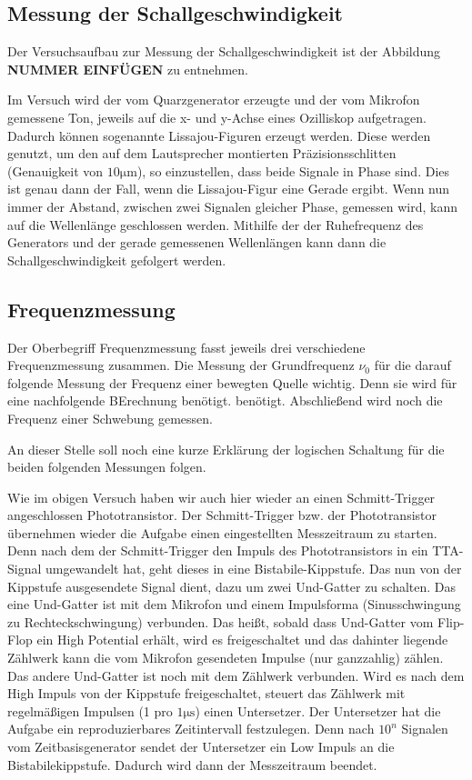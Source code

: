 \documentclass[parskip=half]{scrartcl} %
\begin{document}
\subsection{Messung der Schallgeschwindigkeit}

Der Versuchsaufbau zur Messung der Schallgeschwindigkeit ist der
Abbildung \textbf{ NUMMER EINFÜGEN} zu entnehmen.

Im Versuch wird der vom Quarzgenerator erzeugte und der vom Mikrofon gemessene 
Ton, jeweils auf die x- und y-Achse eines Ozilliskop aufgetragen.
Dadurch können sogenannte Lissajou-Figuren erzeugt werden.
Diese werden genutzt, um den auf dem Lautsprecher montierten Präzisionsschlitten 
(Genauigkeit von $10\si{\micro\meter}$), so 
einzustellen, dass beide Signale in Phase sind. 
Dies ist genau dann der Fall, wenn die Lissajou-Figur eine Gerade ergibt.
Wenn nun immer der Abstand, zwischen zwei 
Signalen gleicher Phase, gemessen wird, kann auf die Wellenlänge geschlossen werden.
Mithilfe der der Ruhefrequenz des Generators und der gerade gemessenen 
Wellenlängen kann dann die Schallgeschwindigkeit gefolgert werden.



\subsection{Frequenzmessung}
Der Oberbegriff Frequenzmessung fasst jeweils drei verschiedene
Frequenzmessung zusammen.
Die Messung der Grundfrequenz $\nu_0$ 
für die darauf folgende Messung der Frequenz einer bewegten Quelle wichtig. Denn sie wird für eine nachfolgende BErechnung benötigt.
benötigt. Abschließend wird noch die Frequenz einer Schwebung gemessen.

An dieser Stelle soll noch eine kurze Erklärung der logischen Schaltung
für die beiden folgenden Messungen folgen.

Wie im obigen Versuch haben wir auch hier wieder an einen
Schmitt-Trigger angeschlossen Phototransistor. 
Der Schmitt-Trigger bzw. der Phototransistor übernehmen wieder die Aufgabe 
einen eingestellten Messzeitraum zu starten. Denn nach dem der 
Schmitt-Trigger den Impuls des Phototransistors in ein TTA-Signal 
umgewandelt hat, geht dieses in eine Bistabile-Kippstufe.
Das nun von der Kippstufe ausgesendete Signal dient, dazu um zwei
Und-Gatter zu schalten. 
Das eine Und-Gatter ist mit dem Mikrofon und einem Impulsforma (Sinusschwingung zu Rechteckschwingung)
verbunden. Das heißt, sobald dass Und-Gatter vom Flip-Flop ein High Potential erhält, wird es freigeschaltet
und das dahinter liegende Zählwerk kann die vom Mikrofon gesendeten Impulse (nur ganzzahlig) zählen.
Das andere Und-Gatter ist noch mit dem Zählwerk verbunden. Wird es nach dem High Impuls von der
Kippstufe freigeschaltet, steuert das Zählwerk mit regelmäßigen Impulsen (1 pro $1\si{\micro\second}$)
einen Untersetzer. Der Untersetzer hat die Aufgabe ein reproduzierbares Zeitintervall festzulegen.
Denn nach $10^n$ Signalen vom Zeitbasisgenerator sendet der Untersetzer ein Low Impuls an die Bistabilekippstufe.
Dadurch wird dann der Messzeitraum beendet.
\end{document}
